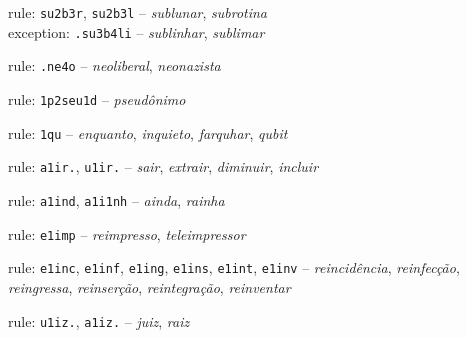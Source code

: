 \begin{rules}
\item\label{rulegrp_sub} rule: \texttt{su2b3r}, \texttt{su2b3l} -- \emph{sublunar}, \emph{subrotina} \\
exception: \texttt{.su3b4li} -- \emph{sublinhar}, \emph{sublimar}

\item\label{rulegrp_neo} rule: \texttt{.ne4o} -- \emph{neoliberal}, \emph{neonazista}

\item\label{rulegrp_pseu} rule: \texttt{1p2seu1d} -- \emph{pseudônimo}

\item\label{rulegrp_qu} rule: \texttt{1qu} -- \emph{enquanto}, \emph{inquieto}, \emph{farquhar}, \emph{qubit}

\item\label{rulegrp_air} rule: \texttt{a1ir.}, \texttt{u1ir.} -- \emph{sair}, \emph{extrair}, \emph{diminuir}, \emph{incluir}

\item\label{rulegrp_ain} rule: \texttt{a1ind}, \texttt{a1i1nh} -- \emph{ainda}, \emph{rainha}

\item\label{rulegrp_eim} rule: \texttt{e1imp} -- \emph{reimpresso}, \emph{teleimpressor}%

\item\label{rulegrp_ein} rule: \texttt{e1inc}, \texttt{e1inf}, \texttt{e1ing}, \texttt{e1ins}, \texttt{e1int}, \texttt{e1inv} -- \emph{reincidência}, \emph{reinfecção}, \emph{reingressa}, \emph{reinserção}, \emph{reintegração}, \emph{reinventar} 


\item\label{rulegrp_aiz} rule: \texttt{u1iz.}, \texttt{a1iz.} -- \emph{juiz}, \emph{raiz}


\end{rules}
